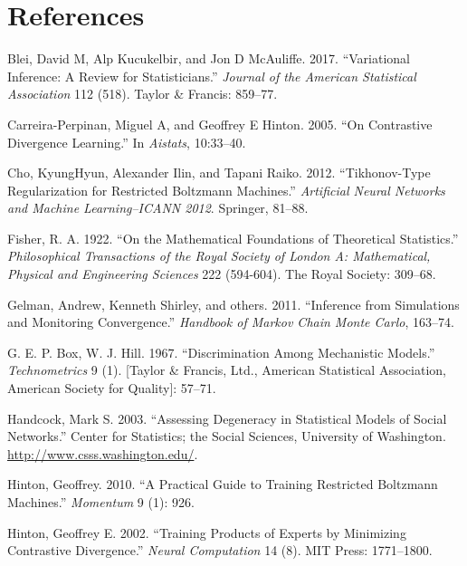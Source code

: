 \documentclass[]{article}
\theoremstyle{definition}
\begin{document}
\hypertarget{references}{%
\section*{References}\label{references}}

\hypertarget{refs}{}
\leavevmode\hypertarget{ref-blei2017variational}{}%
Blei, David M, Alp Kucukelbir, and Jon D McAuliffe. 2017. ``Variational
Inference: A Review for Statisticians.'' \emph{Journal of the American
Statistical Association} 112 (518). Taylor \& Francis: 859--77.

\leavevmode\hypertarget{ref-carreira2005contrastive}{}%
Carreira-Perpinan, Miguel A, and Geoffrey E Hinton. 2005. ``On
Contrastive Divergence Learning.'' In \emph{Aistats}, 10:33--40.

\leavevmode\hypertarget{ref-cho2012tikhonov}{}%
Cho, KyungHyun, Alexander Ilin, and Tapani Raiko. 2012. ``Tikhonov-Type
Regularization for Restricted Boltzmann Machines.'' \emph{Artificial
Neural Networks and Machine Learning--ICANN 2012}. Springer, 81--88.

\leavevmode\hypertarget{ref-fisher1922mathematical}{}%
Fisher, R. A. 1922. ``On the Mathematical Foundations of Theoretical
Statistics.'' \emph{Philosophical Transactions of the Royal Society of
London A: Mathematical, Physical and Engineering Sciences} 222
(594-604). The Royal Society: 309--68.

\leavevmode\hypertarget{ref-gelman2011inference}{}%
Gelman, Andrew, Kenneth Shirley, and others. 2011. ``Inference from
Simulations and Monitoring Convergence.'' \emph{Handbook of Markov Chain
Monte Carlo}, 163--74.

\leavevmode\hypertarget{ref-box1967discrimination}{}%
G. E. P. Box, W. J. Hill. 1967. ``Discrimination Among Mechanistic
Models.'' \emph{Technometrics} 9 (1). {[}Taylor \& Francis, Ltd.,
American Statistical Association, American Society for Quality{]}:
57--71.

\leavevmode\hypertarget{ref-handcock2003assessing}{}%
Handcock, Mark S. 2003. ``Assessing Degeneracy in Statistical Models of
Social Networks.'' Center for Statistics; the Social Sciences,
University of Washington. \url{http://www.csss.washington.edu/}.

\leavevmode\hypertarget{ref-hinton2010practical}{}%
Hinton, Geoffrey. 2010. ``A Practical Guide to Training Restricted
Boltzmann Machines.'' \emph{Momentum} 9 (1): 926.

\leavevmode\hypertarget{ref-hinton2002training}{}%
Hinton, Geoffrey E. 2002. ``Training Products of Experts by Minimizing
Contrastive Divergence.'' \emph{Neural Computation} 14 (8). MIT Press:
1771--1800.
\end{document}
